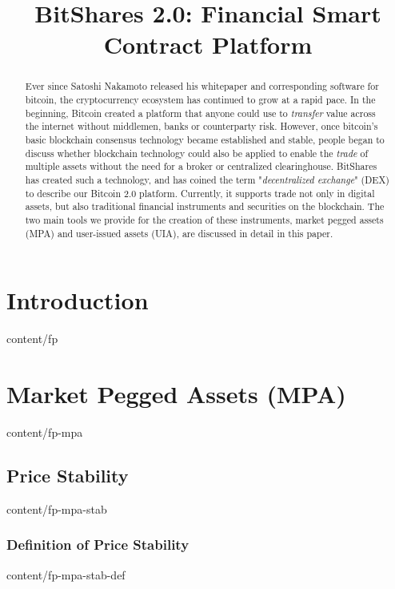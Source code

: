 \documentclass{btswhitepaper}
\title{BitShares 2.0: Financial Smart Contract Platform}
\begin{document}
\sloppy
\maketitle

\begin{abstract}%

  Ever since Satoshi Nakamoto released his whitepaper and corresponding
  software for bitcoin, the cryptocurrency ecosystem has continued to grow at a
  rapid pace. In the beginning, Bitcoin created a platform that anyone could
  use to \emph{transfer} value across the internet without middlemen, banks or
  counterparty risk.  However, once bitcoin's basic blockchain consensus
  technology became established and stable, people began to discuss whether
  blockchain technology could also be applied to enable the \emph{trade} of
  multiple assets without the need for a broker or centralized clearinghouse.
  BitShares has created such a technology, and has coined the term
  "\emph{decentralized exchange}" (DEX) to describe our Bitcoin 2.0 platform.
  Currently, it supports trade not only in digital assets, but also traditional
  financial instruments and securities on the blockchain. The two main tools we
  provide for the creation of these instruments, market pegged assets (MPA) and
  user-issued assets (UIA), are discussed in detail in this paper.

\end{abstract}

\section        { Introduction                                     }  { content/fp                     } 

\section        { Market Pegged Assets (MPA)                       }  { content/fp-mpa                 } 
\subsection     { Price Stability                                  }  { content/fp-mpa-stab            } 
\subsubsection  { Definition of Price Stability                    }  { content/fp-mpa-stab-def        } 
\end{document}
